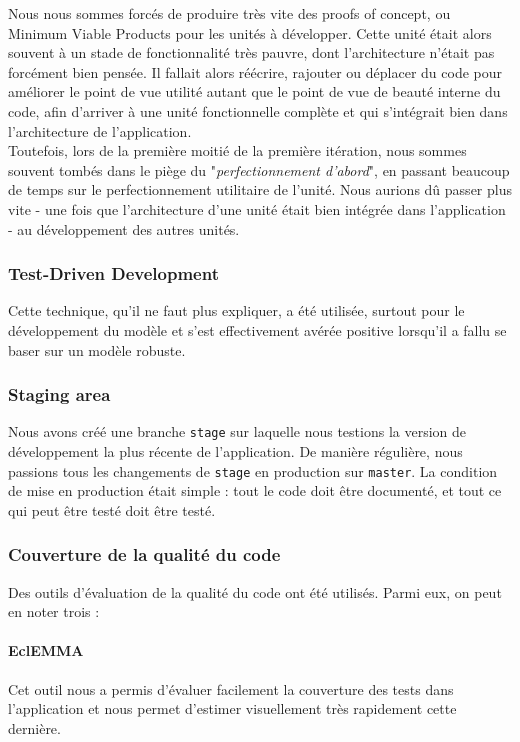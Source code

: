 	Nous nous sommes forcés de produire très vite des proofs of concept, ou 
	Minimum Viable Products pour les unités à développer. Cette unité était 
	alors souvent à un stade de fonctionnalité très pauvre, dont l'architecture 
	n'était pas forcément bien pensée. Il fallait alors réécrire, rajouter ou 
	déplacer du code pour améliorer le point de vue utilité autant que le point 
	de vue de beauté interne du code, afin d'arriver à une unité fonctionnelle 
	complète et qui s'intégrait bien dans l'architecture de l'application. \\

	Toutefois, lors de la première moitié de la première itération, nous sommes
	souvent tombés dans le piège du "\textit{perfectionnement d'abord}", en
	passant beaucoup de temps sur le perfectionnement utilitaire de l'unité.
	Nous aurions dû passer plus vite - une fois que l'architecture d'une unité
	était bien intégrée dans l'application - au développement des autres unités.

	\subsubsection{Test-Driven Development}
	Cette technique, qu'il ne faut plus expliquer, a été utilisée, surtout pour
	le développement du modèle et s'est effectivement avérée positive lorsqu'il
	a fallu se baser sur un modèle robuste.

	\subsubsection{Staging area}
	Nous avons créé une branche \texttt{stage} sur laquelle nous testions la 
	version de développement la plus récente de l'application. De manière
	régulière, nous passions tous les changements de \texttt{stage} en
	production sur \texttt{master}. La condition de mise en production était 
	simple : tout le code doit être documenté, et tout ce qui peut être testé
	doit être testé.

	\subsubsection{Couverture de la qualité du code}
	Des outils d'évaluation de la qualité du code ont été utilisés. Parmi eux, 
	on peut en noter trois : 

	\paragraph{EclEMMA}
	Cet outil nous a permis d'évaluer facilement la couverture des tests dans 
	l'application et nous permet d'estimer visuellement très rapidement cette 
	dernière.

